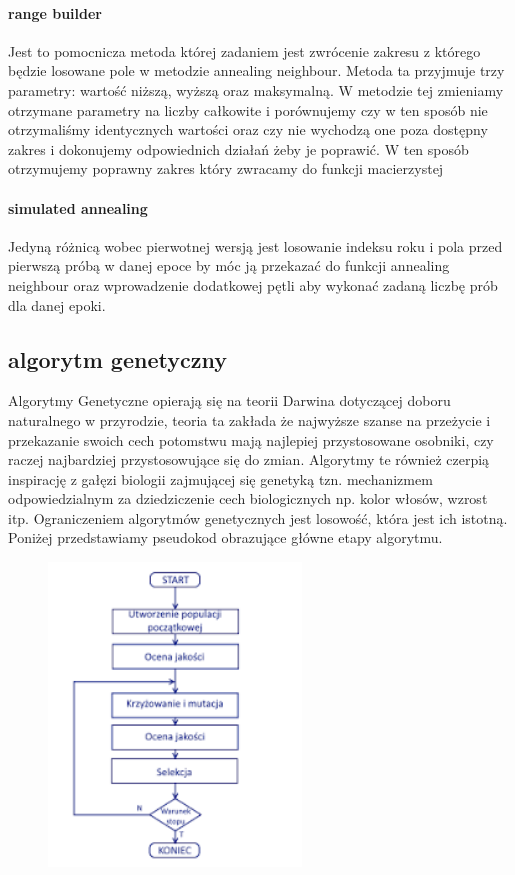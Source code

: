 \documentclass{article}
\begin{document}
 \paragraph{range builder}
 Jest to pomocnicza metoda której zadaniem jest zwrócenie zakresu z którego będzie losowane pole w metodzie annealing neighbour. Metoda ta przyjmuje trzy parametry: wartość niższą, wyższą oraz maksymalną. W metodzie tej zmieniamy otrzymane parametry na liczby całkowite i porównujemy czy w ten sposób nie otrzymaliśmy identycznych wartości oraz czy nie wychodzą one poza dostępny zakres i dokonujemy odpowiednich działań żeby je poprawić. W ten sposób otrzymujemy poprawny zakres który zwracamy do funkcji macierzystej

\paragraph{simulated annealing}
Jedyną różnicą wobec pierwotnej wersją jest losowanie indeksu roku i pola przed pierwszą próbą w danej epoce by móc ją przekazać do funkcji annealing neighbour oraz wprowadzenie dodatkowej pętli aby wykonać zadaną liczbę prób dla danej epoki.

\subsection{algorytm genetyczny}
Algorytmy Genetyczne opierają się na teorii Darwina dotyczącej doboru naturalnego w przyrodzie, teoria ta zakłada że najwyższe szanse na przeżycie i przekazanie swoich cech potomstwu mają najlepiej przystosowane osobniki, czy raczej najbardziej przystosowujące się do zmian. Algorytmy te również czerpią inspirację z gałęzi biologii zajmującej się genetyką tzn. mechanizmem odpowiedzialnym za dziedziczenie cech biologicznych np. kolor włosów, wzrost itp.
Ograniczeniem algorytmów genetycznych jest losowość, która jest ich istotną. Poniżej przedstawiamy pseudokod obrazujące główne etapy algorytmu.

\begin{figure}[h]
        \centering
        \includegraphics[width=0.6\textwidth]{genetic_pseudocode.png}
        \label{fig:paneloperatorski}
\end{figure}
\newpage
\end{document}
